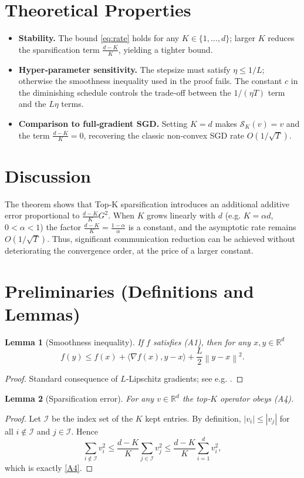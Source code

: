 \documentclass{article}
\newtheorem{lemma}{Lemma}
\newcommand{\R}{\mathbb{R}}
\newcommand{\norm}[1]{\left\|#1\right\|}
\newcommand{\topK}[2]{\mathcal{S}_{#1}(#2)}   %
\begin{document}
\section*{Theoretical Properties}
\begin{itemize}
\item \textbf{Stability.} The bound \eqref{eq:rate} holds for any $K\in\{1,\dots ,d\}$; larger $K$ reduces the sparsification term $\frac{d-K}{K}$, yielding a tighter bound.
\item \textbf{Hyper‑parameter sensitivity.} The stepsize must satisfy $\eta\le 1/L$; otherwise the smoothness inequality used in the proof fails. The constant $c$ in the diminishing schedule controls the trade‑off between the $1/(\eta T)$ term and the $L\eta$ terms.
\item \textbf{Comparison to full‑gradient SGD.} Setting $K=d$ makes $\topK{K}{v}=v$ and the term $\frac{d-K}{K}=0$, recovering the classic non‑convex SGD rate $O(1/\sqrt{T})$.
\end{itemize}

\section*{Discussion}
The theorem shows that Top‑K sparsification introduces an additional additive error proportional to $\frac{d-K}{K}G^{2}$.
When $K$ grows linearly with $d$ (e.g. $K=\alpha d$, $0<\alpha<1$) the factor $\frac{d-K}{K}= \frac{1-\alpha}{\alpha}$ is a constant, and the asymptotic rate remains $O(1/\sqrt{T})$.
Thus, significant communication reduction can be achieved without deteriorating the convergence order, at the price of a larger constant.

\newpage

\section*{Preliminaries (Definitions and Lemmas)}
\begin{lemma}[Smoothness inequality]\label{lem:smooth}
If $f$ satisfies (A1), then for any $x,y\in\R^{d}$
\[
f(y)\le f(x)+\langle\nabla f(x),y-x\rangle+\frac{L}{2}\norm{y-x}^{2}.
\]
\end{lemma}
\begin{proof}
Standard consequence of $L$‑Lipschitz gradients; see e.g. \cite{Nesterov2004}.
\end{proof}

\begin{lemma}[Sparsification error]\label{lem:sparse}
For any $v\in\R^{d}$ the top‑$K$ operator obeys (A4).
\end{lemma}
\begin{proof}
Let $\mathcal{I}$ be the index set of the $K$ kept entries. By definition,
$|v_{i}|\le |v_{j}|$ for all $i\notin\mathcal{I}$ and $j\in\mathcal{I}$. Hence
\[
\sum_{i\notin\mathcal{I}}v_{i}^{2}\le \frac{d-K}{K}\sum_{j\in\mathcal{I}}v_{j}^{2}
\le \frac{d-K}{K}\sum_{i=1}^{d}v_{i}^{2},
\]
which is exactly \eqref{A4}.
\end{proof}
\end{document}
